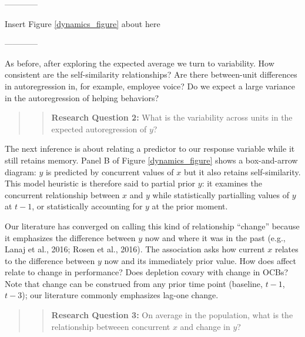 \documentclass[english,,man]{apa6}
\begin{document}
\begin{center}

------------

Insert Figure \ref{dynamics_figure} about here

------------

\end{center}

As before, after exploring the expected average we turn to variability. How consistent are the self-similarity relationships? Are there between-unit differences in autoregression in, for example, employee voice? Do we expect a large variance in the autoregression of helping behaviors?

\begin{quote}
\begin{quote}
\textbf{Research Question 2:} What is the variability across units in the expected autoregression of \(y\)?
\end{quote}
\end{quote}

The next inference is about relating a predictor to our response variable while it still retains memory. Panel B of Figure \ref{dynamics_figure} shows a box-and-arrow diagram: \(y\) is predicted by concurrent values of \(x\) but it also retains self-similarity. This model heuristic is therefore said to partial prior \(y\): it examines the concurrent relationship between \(x\) and \(y\) while statistically partialling values of \(y\) at \(t - 1\), or statistically accounting for \(y\) at the prior moment.

Our literature has converged on calling this kind of relationship \enquote{change} because it emphasizes the difference between \(y\) now and where it was in the past (e.g., Lanaj et al., 2016; Rosen et al., 2016). The association asks how current \(x\) relates to the difference between \(y\) now and its immediately prior value. How does affect relate to change in performance? Does depletion covary with change in OCBs? Note that change can be construed from any prior time point (baseline, \(t-1\), \(t-3\)); our literature commonly emphasizes lag-one change.

\begin{quote}
\begin{quote}
\textbf{Research Question 3:} On average in the population, what is the relationship betweeen concurrent \(x\) and change in \(y\)?
\end{quote}
\end{quote}
\end{document}

